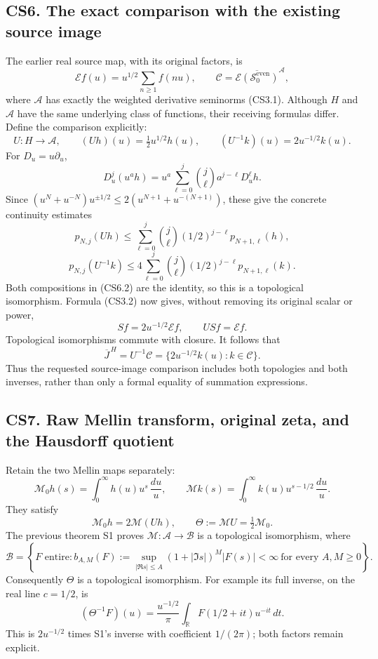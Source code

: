 \subsection{CS6. The exact comparison with the existing source
image}\label{cs6.-the-exact-comparison-with-the-existing-source-image}

The earlier real source map, with its original factors, is \[
\mathcal E f(u)=u^{1/2}\sum_{n\ge1}f(nu),
\qquad
\mathcal C=\overline{\mathcal E(\mathcal S_0^{\mathrm{even}})}^{\mathcal A},
\tag{CS6.1}
\] where \(\mathcal A\) has exactly the weighted derivative seminorms
(CS3.1). Although \(H\) and \(\mathcal A\) have the same underlying
class of functions, their receiving formulas differ. Define the
comparison explicitly: \[
U:H\longrightarrow\mathcal A,\qquad
(Uh)(u)=\tfrac12 u^{1/2}h(u),
\qquad
(U^{-1}k)(u)=2u^{-1/2}k(u).
\tag{CS6.2}
\] For \(D_u=u\partial_u\), \[
D_u^j(u^a h)
=u^a\sum_{\ell=0}^j\binom j\ell a^{j-\ell}D_u^\ell h.
\tag{CS6.3}
\] Since \((u^N+u^{-N})u^{\pm1/2}
\le2(u^{N+1}+u^{-(N+1)})\), these give the concrete continuity estimates
\[
p_{N,j}(Uh)
\le\sum_{\ell=0}^j\binom j\ell
(1/2)^{j-\ell}p_{N+1,\ell}(h),
\] \[
p_{N,j}(U^{-1}k)
\le4\sum_{\ell=0}^j\binom j\ell
(1/2)^{j-\ell}p_{N+1,\ell}(k).
\tag{CS6.4}
\] Both compositions in (CS6.2) are the identity, so this is a
topological isomorphism. Formula (CS3.2) now gives, without removing its
original scalar or power, \[
S f=2u^{-1/2}\mathcal E f,\qquad
USf=\mathcal E f.
\tag{CS6.5}
\] Topological isomorphisms commute with closure. It follows that \[
\boxed{
\overline J^{\,H}=U^{-1}\mathcal C
=\{2u^{-1/2}k(u):k\in\mathcal C\}.
}
\tag{CS6.6}
\] Thus the requested source-image comparison includes both topologies
and both inverses, rather than only a formal equality of summation
expressions.

\subsection{CS7. Raw Mellin transform, original zeta, and the Hausdorff
quotient}\label{cs7.-raw-mellin-transform-original-zeta-and-the-hausdorff-quotient}

Retain the two Mellin maps separately: \[
\mathcal M_0h(s)=\int_0^\infty h(u)u^s\,\frac{du}{u},
\qquad
\mathcal Mk(s)=\int_0^\infty k(u)u^{s-1/2}\,\frac{du}{u}.
\tag{CS7.1}
\] They satisfy \[
\mathcal M_0h=2\mathcal M(Uh),\qquad
\Theta:=\mathcal M U=\tfrac12\mathcal M_0.
\tag{CS7.2}
\] The previous theorem S1 proves \(\mathcal M:\mathcal A\to\mathcal B\)
is a topological isomorphism, where \[
\mathcal B=\left\{F\text{ entire}:
b_{A,M}(F):=\sup_{|\Re s|\le A}
(1+|\Im s|)^M|F(s)|<\infty\ \text{for every }A,M\ge0\right\}.
\tag{CS7.3}
\] Consequently \(\Theta\) is a topological isomorphism. For example its
full inverse, on the real line \(c=1/2\), is \[
(\Theta^{-1}F)(u)
=\frac{u^{-1/2}}{\pi}\int_{\mathbb R}
F(1/2+it)u^{-it}\,dt.
\tag{CS7.4}
\] This is \(2u^{-1/2}\) times S1's inverse with coefficient
\(1/(2\pi)\); both factors remain explicit.

